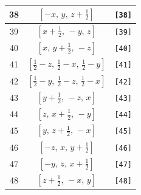 \documentclass[fleqn,8pt]{jsarticle}
\begin{document}
\begin{longtable}{ccc}
38 & $\left[ - x,\, y,\, z + \frac{1}{2} \right]$ & {\tt [38]} \\ \hline
39 & $\left[ x + \frac{1}{2},\, - y,\, z \right]$ & {\tt [39]} \\ \hline
40 & $\left[ x,\, y + \frac{1}{2},\, - z \right]$ & {\tt [40]} \\ \hline
41 & $\left[ \frac{1}{2} - z,\, \frac{1}{2} - x,\, \frac{1}{2} - y \right]$ & {\tt [41]} \\ \hline
42 & $\left[ \frac{1}{2} - y,\, \frac{1}{2} - z,\, \frac{1}{2} - x \right]$ & {\tt [42]} \\ \hline
43 & $\left[ y + \frac{1}{2},\, - z,\, x \right]$ & {\tt [43]} \\ \hline
44 & $\left[ z,\, x + \frac{1}{2},\, - y \right]$ & {\tt [44]} \\ \hline
45 & $\left[ y,\, z + \frac{1}{2},\, - x \right]$ & {\tt [45]} \\ \hline
46 & $\left[ - z,\, x,\, y + \frac{1}{2} \right]$ & {\tt [46]} \\ \hline
47 & $\left[ - y,\, z,\, x + \frac{1}{2} \right]$ & {\tt [47]} \\ \hline
48 & $\left[ z + \frac{1}{2},\, - x,\, y \right]$ & {\tt [48]} \\
\end{longtable}
\end{document}
